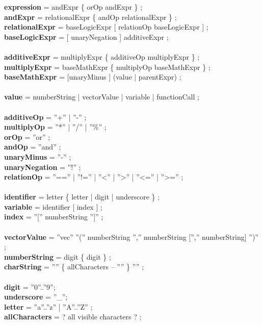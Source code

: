 \documentclass[11pt]{article} %
\begin{document}
{\textbf{expression} = andExpr \{ orOp andExpr \} ;\\
\textbf{andExpr} = relationalExpr \{ andOp relationalExpr \} ;\\
\textbf{relationalExpr} = baseLogicExpr [ relationOp baseLogicExpr ] ;\\
\textbf{baseLogicExpr} = [ unaryNegation ] additiveExpr ;\\
\\
\textbf{additiveExpr} = multiplyExpr \{ additiveOp multiplyExpr \} ;\\
\textbf{multiplyExpr} = baseMathExpr \{ multiplyOp baseMathExpr \} ;\\
\textbf{baseMathExpr} = [unaryMinus ] (value | parentExpr) ;\\
\\
\textbf{value} = numberString | vectorValue | variable | functionCall ;\\
\\
\textbf{additiveOp} = ''+'' | ''-­'' ;\\
\textbf{multiplyOp} = ''*'' | ''/'' | ''\%'' ;\\
\textbf{orOp} = ''or'' ;\\
\textbf{andOp} = ''and'' ;\\
\textbf{unaryMinus} = ''-'' ;\\
\textbf{unaryNegation} = ''!'' ;\\
\textbf{relationOp} = ''=='' | ''!='' | ''<'' | ''>'' | ''<='' | ''>='' ;\\
\\
\textbf{identifier} = letter \{ letter | digit | underscore \} ;\\
\textbf{variable} = identifier [ index ] ;\\
\textbf{index} = ''['' numberString '']'' ;\\
\\
\textbf{vectorValue} = ''vec'' ''('' numberString '','' numberString ['','' numberString] '')'' ;\\ 
\textbf{numberString} = digit \{ digit \} ;\\
\textbf{charString} = '''' \{ allCharacters – '''' \} '''' ;\\
\\
\textbf{digit} = ''0''..''9'';\\
\textbf{underscore} = ''\_'';\\
\textbf{letter} = ''a''..''z'' | ''A''..''Z'' ;\\
\textbf{allCharacters} = ? all visible characters ? ;\\
}
\end{document}
